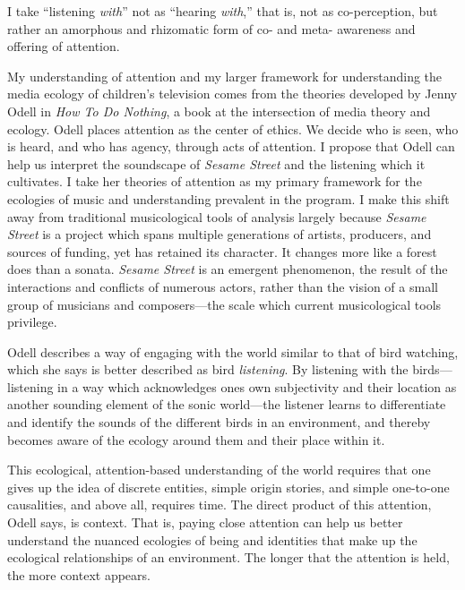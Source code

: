 \documentclass[12pt,letterpaper]{article}
\newcommand{\ses}{\textit{Sesame Street }}
\begin{document}
	I take ``listening \textit{with}'' not as ``hearing \textit{with},'' 
	that is, not as co-perception, but rather an amorphous and rhizomatic
	form of co- and meta- awareness and offering of attention.  

	My understanding of attention and my larger framework for understanding
	the media ecology of children's television comes from the theories 
	developed by Jenny Odell in 
	\textit{How To Do Nothing}, a book at the intersection of media theory
	and ecology. Odell places attention as the center of ethics. We decide 
	who is seen, who is heard, and who has agency, through acts of 
	attention. \autocite[154]{Odell} I propose that Odell can help us 
	interpret the soundscape of \textit{Sesame Street} and the listening
	which it cultivates. I take her theories of attention as my primary
	framework for the ecologies of music and understanding
	prevalent in the program. I make this shift away from traditional
	musicological tools of analysis largely because \ses is a project which
	spans multiple generations of artists, producers, and sources of
	funding, yet has retained its character. It changes more like a forest
	does than a sonata. \ses is an emergent phenomenon, the result of the
	interactions and conflicts of numerous actors, rather than the vision
	of a small group of musicians and composers---the scale which current 
	musicological tools privilege. 

	Odell describes a way of engaging with the 
	world similar to that of bird watching, which she says is better 
	described as bird \textit{listening}.
	By listening with the birds---listening in a way which acknowledges
	ones own subjectivity and their location as another sounding element of
	the sonic world---the listener learns to differentiate and identify 
	the sounds 
	of the different birds in an environment, and thereby becomes aware
	of the ecology around them and their place within 
	it.\autocite[33/366]{Odell} 
	
	This ecological, attention-based understanding of the world requires 
	that one gives up the idea of discrete entities, simple origin stories,
	and simple one-to-one causalities, and above all, requires time.
	The direct product of this attention, Odell says, is context. 
	That is, paying close attention can help us better understand the 
	nuanced ecologies of being and identities that make up the ecological
	relationships of an environment. The longer that the attention is held, 
	the more context appears.\autocite[155]{Odell} 
\end{document}
